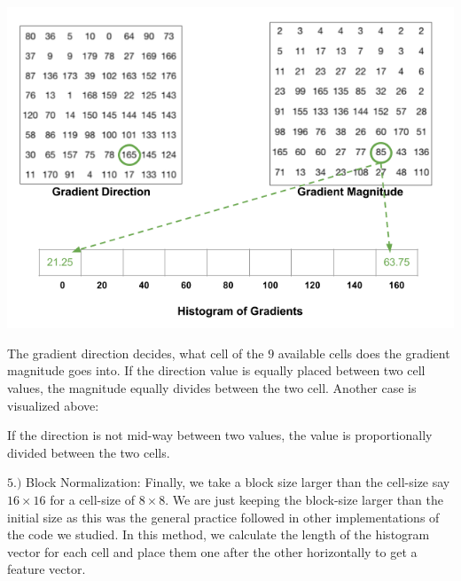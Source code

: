 \documentclass{article}
\begin{document}
\includegraphics[width=\textwidth]{hog2.png}

The gradient direction decides, what cell of the $9$ available cells does the gradient magnitude goes into. If the direction value is equally placed between two cell values, the magnitude equally divides between the two cell. Another case is visualized above\cite{mallick_2016}:


If the direction is not mid-way between two values, the value is proportionally divided between the two cells.

$5.)$ Block Normalization: Finally, we take a block size larger than the cell-size say $16\times16$ for a cell-size of $8\times8$. We are just keeping the block-size larger than the initial size as this was the general practice followed in other implementations of the code we studied. In this method, we calculate the length of the histogram vector for each cell and place them one after the other horizontally to get a feature vector.
\end{document}
